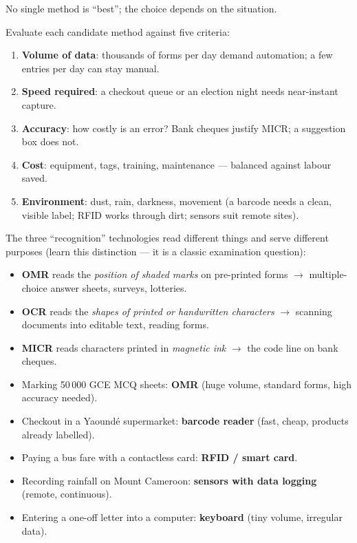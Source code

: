 \documentclass[11pt]{article}
\begin{document}
No single method is ``best''; the choice depends on the situation.

\begin{methode}
Evaluate each candidate method against five criteria:
\begin{enumerate}
\item \textbf{Volume of data}: thousands of forms per day demand automation; a few entries per day can stay manual.
\item \textbf{Speed required}: a checkout queue or an election night needs near-instant capture.
\item \textbf{Accuracy}: how costly is an error? Bank cheques justify MICR; a suggestion box does not.
\item \textbf{Cost}: equipment, tags, training, maintenance --- balanced against labour saved.
\item \textbf{Environment}: dust, rain, darkness, movement (a barcode needs a clean, visible label; RFID works through dirt; sensors suit remote sites).
\end{enumerate}
\end{methode}

\begin{propriete}
The three ``recognition'' technologies read different things and serve different purposes (learn this distinction --- it is a classic examination question):
\begin{itemize}
\item \textbf{OMR} reads the \emph{position of shaded marks} on pre-printed forms $\rightarrow$ multiple-choice answer sheets, surveys, lotteries.
\item \textbf{OCR} reads the \emph{shapes of printed or handwritten characters} $\rightarrow$ scanning documents into editable text, reading forms.
\item \textbf{MICR} reads characters printed in \emph{magnetic ink} $\rightarrow$ the code line on bank cheques.
\end{itemize}
\end{propriete}

\begin{exemplebox}
\begin{itemize}
\item Marking 50\,000 GCE MCQ sheets: \textbf{OMR} (huge volume, standard forms, high accuracy needed).
\item Checkout in a Yaound\'e supermarket: \textbf{barcode reader} (fast, cheap, products already labelled).
\item Paying a bus fare with a contactless card: \textbf{RFID / smart card}.
\item Recording rainfall on Mount Cameroon: \textbf{sensors with data logging} (remote, continuous).
\item Entering a one-off letter into a computer: \textbf{keyboard} (tiny volume, irregular data).
\end{itemize}
\end{exemplebox}
\end{document}
